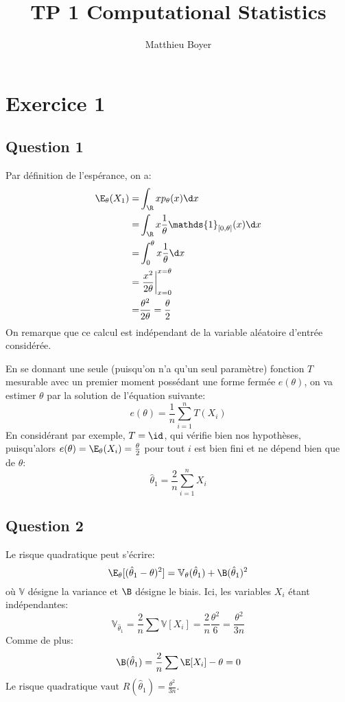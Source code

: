 \documentclass[math, info]{mpb-cours}
\title{TP 1 Computational Statistics}
\author{Matthieu Boyer}
\def\that{\hat{\theta}}
\def\V{\mathbb{V}}
\begin{document}
\maketitle

\section{Exercice 1}
\subsection{Question 1}
Par définition de l'espérance, on a:
\begin{equation*}
	\begin{aligned}
		\E_{\theta}(X_{1}) = & \int_{\R}xp_{\theta}(x)\d x                               \\
		=                    & \int_{\R}x\frac{1}{\theta}\mathds{1}_{[0, \theta]}(x)\d x \\
		=                    & \int_{0}^{\theta} x\frac{1}{\theta}\d x                   \\
		=                    & \left.\frac{x^{2}}{2\theta}\right|_{x= 0}^{x = \theta}    \\
		=                    & \frac{\theta^{2}}{2\theta} = \frac{\theta}{2}
	\end{aligned}
\end{equation*}
On remarque que ce calcul est indépendant de la variable aléatoire d'entrée considérée.

En se donnant une seule (puisqu'on n'a qu'un seul paramètre) fonction $T$ mesurable avec un premier moment possédant une forme fermée $e(\theta)$, on va estimer $\theta$ par la solution de l'équation suivante:
\begin{equation*}
	e(\theta) = \frac{1}{n}\sum_{i = 1}^{n}T(X_{i})
\end{equation*}
En considérant par exemple, $T = \id$, qui vérifie bien nos hypothèses, puisqu'alors $e(\theta) = \E_{\theta}(X_{i}) = \frac{\theta}{2}$ pour tout $i$ est bien fini et ne dépend bien que de $\theta$:
\begin{equation*}
	\boxed{\that_{1} = \frac{2}{n}\sum_{i = 1}^{n}X_{i}}
\end{equation*}

\subsection{Question 2}
Le risque quadratique peut s'écrire:
\begin{equation*}
	\E_{\theta}[(\that_{1} - \theta)^{2}] = \V_{\theta}(\that_{1}) + \B(\that_{1})^{2}
\end{equation*}
où $\V$ désigne la variance et $\B$ désigne le biais.
Ici, les variables $X_{i}$ étant indépendantes:
\begin{equation*}
	\V_{\that_{1}} = \frac{2}{n}\sum \V[X_{i}] = \frac{2}{n }\frac{\theta^{2}}{6} = \frac{\theta^{2}}{3n}
\end{equation*}
Comme de plus:
\begin{equation*}
	\B(\that_{1}) = \frac{2}{n}\sum \E[X_{i}] - \theta = 0
\end{equation*}
$\boxed{\text{Le risque quadratique vaut $R\left(\that_{1}\right)= \frac{\theta^{2}}{3n}$.}}$
\end{document}
